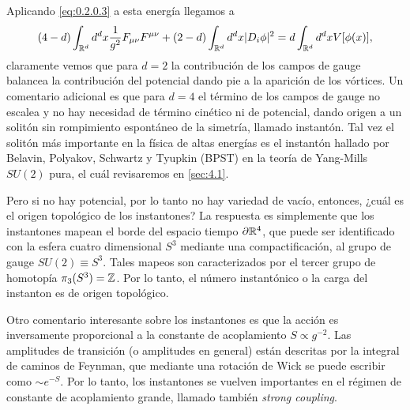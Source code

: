 Aplicando \eqref{eq:0.2.0.3} a esta energía llegamos a
\begin{align}
	(4-d)\int_{\mathbb{R}^d}d^dx\frac{1}{g^2}F_{\mu\nu}F^{\mu\nu}+(2-d)\int_{\mathbb{R}^d}d^dx|D_i\phi|^2 = d\int_{\mathbb{R}^d}d^dx V[\phi(x)],
\end{align}
claramente vemos que para $d=2$ la contribución de los campos de gauge balancea la contribución del potencial dando pie a la aparición de los vórtices. Un comentario adicional es que para $d=4$ el término de los campos de gauge no escalea y no hay necesidad de término cinético ni de potencial, dando origen a un solitón sin rompimiento espontáneo de la simetría, llamado instantón. Tal vez el solitón más importante en la física de altas energías es el instantón hallado por Belavin, Polyakov, Schwartz y Tyupkin (BPST) en la teoría de Yang-Mills $SU(2)$ pura, el cuál revisaremos en \ref{sec:4.1}.

Pero si no hay potencial, por lo tanto no hay variedad de vacío, entonces, ¿cuál es el origen topológico de los instantones? La respuesta es simplemente que los instantones mapean el borde del espacio tiempo $\partial\mathbb{R}^4$, que puede ser identificado con la esfera cuatro dimensional $S^3$ mediante una compactificación, al grupo de gauge $SU(2)\equiv S^3$. Tales mapeos son caracterizados por el tercer grupo de homotopía $\pi_3(S^3)=\mathbb{Z}$. Por lo tanto, el número instantónico o la carga del instanton es de origen topológico.

Otro comentario interesante sobre los instantones es que la acción es inversamente proporcional a la constante de acoplamiento $S\propto g^{-2}$. Las amplitudes de transición (o amplitudes en general) están descritas por la integral de caminos de Feynman, que mediante una rotación de Wick se puede escribir como $\sim e^{-S}$. Por lo tanto, los instantones se vuelven importantes en el régimen de constante de acoplamiento grande, llamado también \emph{strong coupling}.
